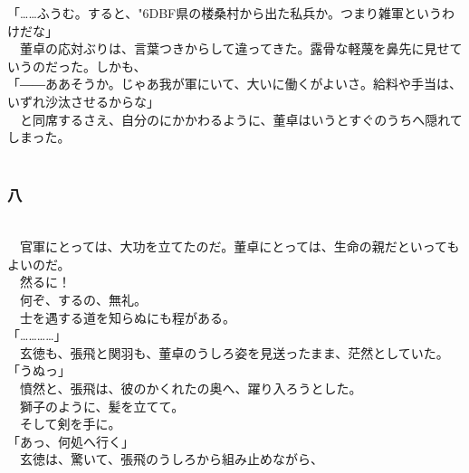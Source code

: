 \documentclass[
  paper=a5,
  fontsize=10pt,
  jafontsize=9.5pt,
  tate,                  %
  open_bracket_pos=nibu, %
]{jlreq}
\begin{document}
「……ふうむ。すると、{\char"6DBF}県の楼桑村から出た私兵か。つまり雑軍というわけだな」\\


　董卓の応対ぶりは、言葉つきからして違ってきた。露骨な軽蔑を鼻先に見せていうのだった。しかも、\\


「――ああそうか。じゃあ我が軍にいて、大いに働くがよいさ。給料や手当は、いずれ沙汰させるからな」\\


　と同席するさえ、自分のにかかわるように、董卓はいうとすぐのうちへ隠れてしまった。\\

\\

\subsubsection{八}

\\


　官軍にとっては、大功を立てたのだ。董卓にとっては、生命の親だといってもよいのだ。\\


　然るに！\\


　何ぞ、するの、無礼。\\


　士を遇する道を知らぬにも程がある。\\


「…………」\\


　玄徳も、張飛と関羽も、董卓のうしろ姿を見送ったまま、茫然としていた。\\


「うぬっ」\\


　憤然と、張飛は、彼のかくれたの奥へ、躍り入ろうとした。\\


　獅子のように、髪を立てて。\\


　そして剣を手に。\\


「あっ、何処へ行く」\\


　玄徳は、驚いて、張飛のうしろから組み止めながら、\\
\end{document}
